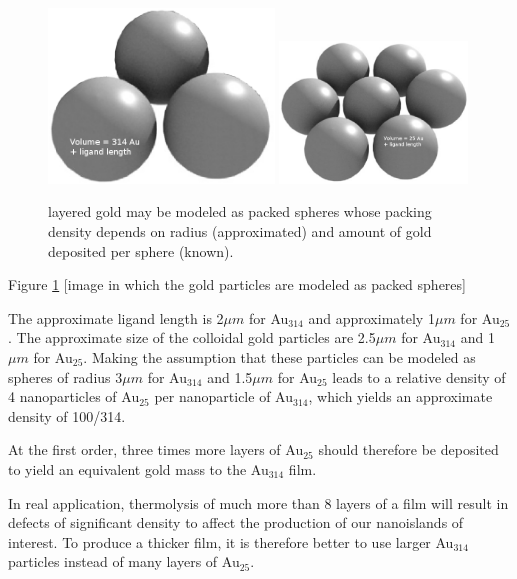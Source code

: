 \documentclass[12pt,oneside,english]{article}
\begin{document}
	\begin{figure}
		\includegraphics[width=60mm]{images/willitblend-big.eps}
		\includegraphics[width=50mm]{images/willitblend.eps}
		\caption{layered gold may be modeled as packed spheres whose packing density depends on radius (approximated) and amount of gold deposited per sphere (known).}
		\label{f:packed_spheres}
	\end{figure}
	Figure \ref{f:packed_spheres} [image in which the gold particles are modeled as packed spheres]	
	
	The approximate ligand length is 2${\mu}m$ for Au$_{314}$ and approximately 1${\mu}m$ for Au$_{25}$.
	The approximate size of the colloidal gold particles are 2.5${\mu}m$ for Au$_{314}$ and 1${\mu}m$ for Au$_{25}$.
	Making the assumption that these particles can be modeled as spheres of radius 3${\mu}m$ for Au$_{314}$ and 1.5${\mu}m$ for Au$_{25}$ leads to a relative density of 4 nanoparticles of Au$_{25}$ per nanoparticle of Au$_{314}$, which yields an approximate density of 100/314.
	
	At the first order, three times more layers of Au$_{25}$ should therefore be deposited to yield an equivalent gold mass to the Au$_{314}$ film.
	
	In real application, thermolysis of much more than 8 layers of a film will result in defects of significant density to affect the production of our nanoislands of interest.
	To produce a thicker film, it is therefore better to use larger Au$_{314}$ particles instead of many layers of Au$_{25}$.
\end{document}
